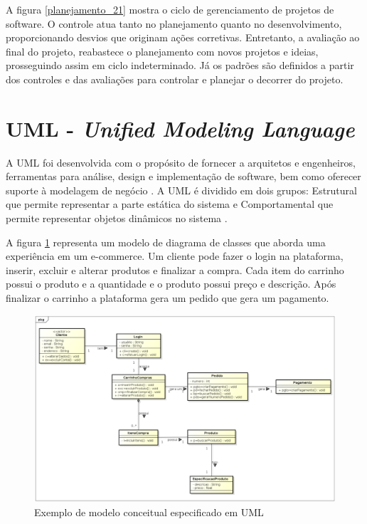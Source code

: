 A figura \ref{planejamento_21} mostra o ciclo de gerenciamento de projetos de software. O controle atua tanto no planejamento quanto no desenvolvimento, proporcionando desvios que originam ações corretivas. Entretanto, a avaliação ao final do projeto, reabastece o planejamento com novos projetos e ideias, prosseguindo assim em ciclo indeterminado. Já os padrões são definidos a partir dos controles e das avaliações para controlar e planejar o decorrer do projeto.


\section{UML - \textit{Unified Modeling Language}}
A UML foi desenvolvida com o propósito de fornecer a
arquitetos e engenheiros, ferramentas para análise, design e implementação de software, bem
como oferecer suporte à modelagem de negócio \cite{gasparini2018driv}. A UML é dividido em dois grupos: Estrutural que permite representar a parte estática do sistema e Comportamental que permite representar objetos dinâmicos no sistema \cite{silva2018sasml}.

A figura \ref{Exemplo_UML} representa um modelo de diagrama de classes que aborda uma experiência em um e-commerce. Um cliente pode fazer o login na plataforma, inserir, excluir e alterar produtos e finalizar a compra. Cada item do carrinho possui o produto e a quantidade e o produto possui preço e descrição.
Após finalizar o carrinho a plataforma gera um pedido que gera um pagamento.
\begin{figure}[htb]
	\caption{\label{Exemplo_UML} Exemplo de modelo conceitual especificado em UML}
	\begin{center}
		\includegraphics[scale=0.45]{./Figuras/Exemplo_UML.png}
	\end{center}
\end{figure}

